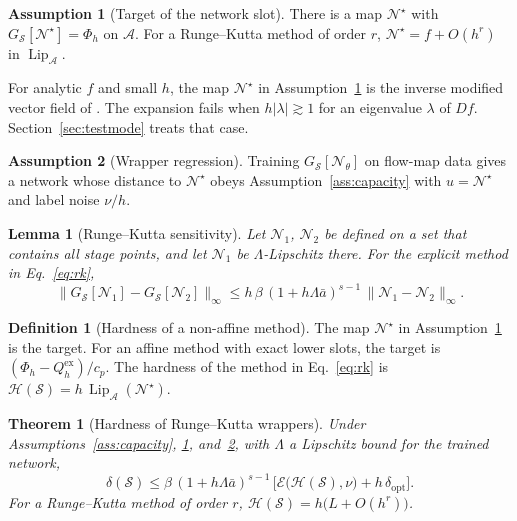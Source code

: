 \documentclass[11pt]{article}
\newtheorem{theorem}{Theorem}
\newtheorem{lemma}{Lemma}
\theoremstyle{definition}
\newtheorem{definition}{Definition}
\newtheorem{assumption}{Assumption}
\theoremstyle{remark}
\newcommand{\Aset}{\mathcal{A}}          %
\newcommand{\Net}{\mathcal{N}_\theta}    %
\newcommand{\Netstar}{\mathcal{N}^\star} %
\newcommand{\Meth}{\mathcal{S}}          %
\newcommand{\Hard}{\mathcal{H}}          %
\newcommand{\Err}{\mathcal{E}}           %
\newcommand{\Lip}{\operatorname{Lip}_{\Aset}}
\newcommand{\supA}[1]{\|#1\|_{\infty}}
\newcommand{\ex}{\mathrm{ex}}
\begin{document}
\begin{assumption}[Target of the network slot]\label{ass:target}
There is a map $\Netstar$ with $G_\Meth[\Netstar] = \Phi_h$ on $\Aset$.
For a Runge--Kutta method of order $r$, $\Netstar = f + O(h^r)$ in $\Lip$.
\end{assumption}

For analytic $f$ and small $h$, the map $\Netstar$ in Assumption~\ref{ass:target} is the inverse modified vector field of \cite{zhu2020imde}.
The expansion fails when $h|\lambda| \gtrsim 1$ for an eigenvalue $\lambda$ of $Df$.
Section~\ref{sec:testmode} treats that case.

\begin{assumption}[Wrapper regression]\label{ass:wrapper}
Training $G_\Meth[\Net]$ on flow-map data gives a network whose distance to $\Netstar$ obeys Assumption~\ref{ass:capacity} with $u = \Netstar$ and label noise $\nu/h$.
\end{assumption}

\begin{lemma}[Runge--Kutta sensitivity]\label{lem:rk}
Let $\mathcal N_1$, $\mathcal N_2$ be defined on a set that contains all stage points, and let $\mathcal N_1$ be $\Lambda$-Lipschitz there.
For the explicit method in Eq.~\eqref{eq:rk},
\begin{equation}\label{eq:rksens}
\supA{G_\Meth[\mathcal N_1] - G_\Meth[\mathcal N_2]} \le h\,\beta\,(1 + h\Lambda\bar a)^{s-1}\, \|\mathcal N_1 - \mathcal N_2\|_{\infty}.
\end{equation}
\end{lemma}

\begin{definition}[Hardness of a non-affine method]\label{def:hardnessNA}
The map $\Netstar$ in Assumption~\ref{ass:target} is the target.
For an affine method with exact lower slots, the target is $(\Phi_h - Q_h^\ex)/c_p$.
The hardness of the method in Eq.~\eqref{eq:rk} is $\Hard(\Meth) = h\,\Lip(\Netstar)$.
\end{definition}

\begin{theorem}[Hardness of Runge--Kutta wrappers]\label{thm:nonaffine}
Under Assumptions~\ref{ass:capacity}, \ref{ass:target}, and~\ref{ass:wrapper}, with $\Lambda$ a Lipschitz bound for the trained network,
\begin{equation}\label{eq:thm2}
\delta(\Meth) \le \beta\,(1 + h\Lambda\bar a)^{s-1}\, \Big[\Err\big(\Hard(\Meth), \nu\big) + h\,\delta_{\mathrm{opt}}\Big].
\end{equation}
For a Runge--Kutta method of order $r$, $\Hard(\Meth) = h\big(L + O(h^r)\big)$.
\end{theorem}
\end{document}
